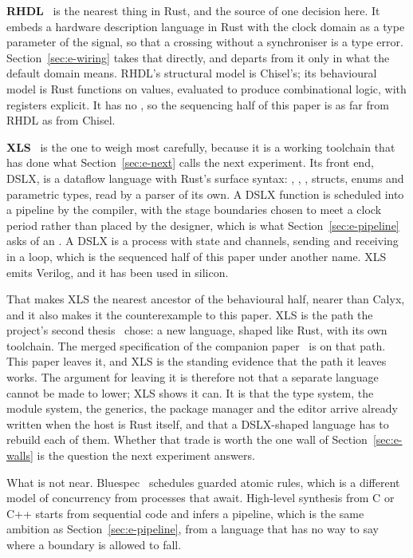 \textbf{RHDL}~\cite{rhdl} is the nearest thing in Rust, and the source
of one decision here. It embeds a hardware description language in Rust
with the clock domain as a type parameter of the signal, so that a
crossing without a synchroniser is a type error. Section~\ref{sec:e-wiring}
takes that directly, and departs from it only in what the default domain
means. RHDL's structural model is Chisel's; its behavioural model is
Rust functions on values, evaluated to produce combinational logic, with
registers explicit. It has no , so the sequencing half of
this paper is as far from RHDL as from Chisel.

\textbf{XLS}~\cite{xls} is the one to weigh most carefully, because it
is a working toolchain that has done what Section~\ref{sec:e-next} calls
the next experiment. Its front end, DSLX, is a dataflow language with
Rust's surface syntax: , , , structs,
enums and parametric types, read by a parser of its own. A DSLX function
is scheduled into a pipeline by the compiler, with the stage boundaries
chosen to meet a clock period rather than placed by the designer, which
is what Section~\ref{sec:e-pipeline} asks of an . A DSLX
 is a process with state and channels, sending and receiving
in a loop, which is the sequenced half of this paper under another
name. XLS emits Verilog, and it has been used in silicon.

That makes XLS the nearest ancestor of the behavioural half, nearer than
Calyx, and it also makes it the counterexample to this paper. XLS is the
path the project's second thesis~\cite{theses} chose: a new language,
shaped like Rust, with its own toolchain. The merged specification of
the companion paper~\cite{merge} is on that path. This paper leaves it,
and XLS is the standing evidence that the path it leaves works. The
argument for leaving it is therefore not that a separate language cannot
be made to lower; XLS shows it can. It is that the type system, the
module system, the generics, the package manager and the editor arrive
already written when the host is Rust itself, and that a DSLX-shaped
language has to rebuild each of them. Whether that trade is worth the
one wall of Section~\ref{sec:e-walls} is the question the next
experiment answers.

What is not near. Bluespec~\cite{nikhil2004} schedules guarded atomic
rules, which is a different model of concurrency from processes that
await. High-level synthesis from C or C++ starts from sequential code and
infers a pipeline, which is the same ambition as
Section~\ref{sec:e-pipeline}, from a language that has no way to say
where a boundary is allowed to fall.

